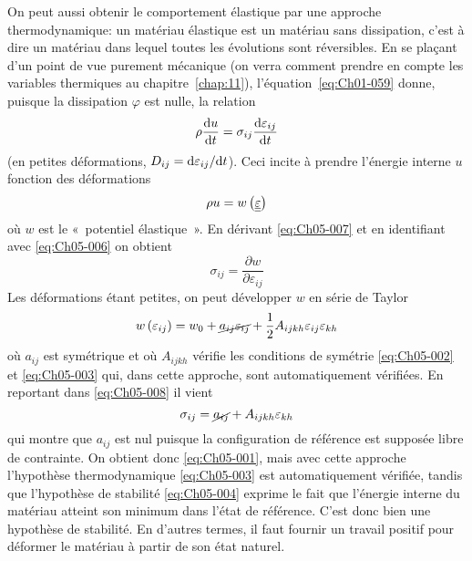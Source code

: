 On peut aussi obtenir le comportement élastique par une approche thermodynamique: un matériau élastique est un matériau sans dissipation, c'est à dire un matériau dans lequel toutes les évolutions sont réversibles.
En se plaçant d'un point de vue purement mécanique (on verra comment prendre en compte les variables thermiques au chapitre~\ref{chap:11}), l'équation~\eqref{eq:Ch01-059} donne, puisque la dissipation $\varphi$ est nulle, la relation
\begin{equation}
    \rho \frac{\mathrm{d} u}{\mathrm{d} t} = \sigma_{ij} \frac{\mathrm{d} \varepsilon_{ij}}{\mathrm{d} t}
    \label{eq:Ch05-006}
\end{equation}
(en petites déformations, $D_{ij} = \mathrm{d} \varepsilon_{ij} / \mathrm{d} t$).
Ceci incite à prendre l'énergie interne $u$ fonction des déformations
\begin{equation}
    \rho u = w \left( \underline{\underline{\varepsilon}} \right)
    \label{eq:Ch05-007}
\end{equation}
où $w$ est le «~potentiel élastique~».
En dérivant \eqref{eq:Ch05-007} et en identifiant avec \eqref{eq:Ch05-006} on obtient
\begin{equation}
    \sigma_{ij} = \frac{\partial w}{\partial \varepsilon_{ij}}
    \label{eq:Ch05-008}
\end{equation}
Les déformations étant petites, on peut développer $w$ en série de Taylor
\begin{equation}
    w \left( \varepsilon_{ij} \right) = w_0 + \cancel{a_{ij} \varepsilon_{ij}} + \frac{1}{2} A_{ijkh} \varepsilon_{ij}\varepsilon_{kh}
    \label{<++>}
\end{equation}
où $a_{ij}$ est symétrique et où $A_{ijkh}$ vérifie les conditions de symétrie \eqref{eq:Ch05-002} et \eqref{eq:Ch05-003} qui, dans cette approche, sont automatiquement vérifiées.
En reportant dans \eqref{eq:Ch05-008} il vient
\begin{displaymath}
    \sigma_{ij} = \cancel{a_{ij}} + A_{ijkh} \varepsilon_{kh}
\end{displaymath}
qui montre que $a_{ij}$ est nul puisque la configuration de référence est supposée libre de contrainte.
On obtient donc \eqref{eq:Ch05-001}, mais avec cette approche l'hypothèse thermodynamique \eqref{eq:Ch05-003} est automatiquement vérifiée, tandis que l'hypothèse de stabilité \eqref{eq:Ch05-004} exprime le fait que l'énergie interne du matériau atteint son minimum dans l'état de référence.
C'est donc bien une hypothèse de stabilité.
En d'autres termes, il faut fournir un travail positif pour déformer le matériau à partir de son état naturel.


